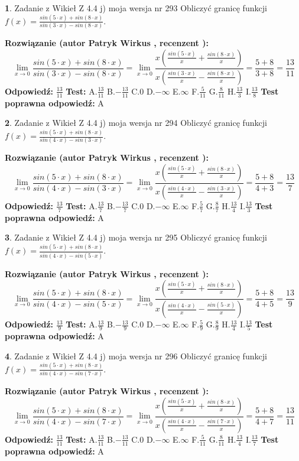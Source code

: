 \documentclass[12pt, a4paper]{article}
\theoremstyle{definition} %
\newtheorem{zad}{}
\newcommand{\zadStart}[1]{\begin{zad}#1\newline}
\newcommand{\zadStop}{\end{zad}}
\newcommand{\rozwStart}[2]{\noindent \textbf{Rozwiązanie (autor #1 , recenzent #2): }\newline}
\newcommand{\rozwStop}{\newline}
\newcommand{\odpStart}{\noindent \textbf{Odpowiedź:}\newline}
\newcommand{\odpStop}{\newline}
\newcommand{\testStart}{\noindent \textbf{Test:}\newline}
\newcommand{\testStop}{\newline}
\newcommand{\kluczStart}{\noindent \textbf{Test poprawna odpowiedź:}\newline}
\newcommand{\kluczStop}{\newline}
\begin{document}
\zadStart{Zadanie z Wikieł Z 4.4 j) moja wersja nr 293}
Obliczyć granicę funkcji $f(x)=\frac{sin(5\cdot x) +sin(8\cdot x)}{sin(3\cdot x) -sin(8\cdot x)}$.
\zadStop
\rozwStart{Patryk Wirkus}{}
$$\lim\limits_{x\to 0}\frac{sin(5\cdot x) +sin(8\cdot x)}{sin(3\cdot x) -sin(8\cdot x)}=\lim\limits_{x\to 0}\frac{x(\frac{sin(5\cdot x)}{x}+\frac{sin(8\cdot x)}{x})}{x(\frac{sin(3\cdot x)}{x}-\frac{sin(8\cdot x)}{x})}=\frac{5+8}{3+8} = \frac{13}{11}$$
\rozwStop
\odpStart
$\frac{13}{11}$
\odpStop
\testStart
A.$\frac{13}{11}$
B.$-\frac{13}{11}$
C.$0$
D.$-\infty$
E.$\infty$
F.$\frac{5}{11}$
G.$\frac{8}{11}$
H.$\frac{13}{3}$
I.$\frac{13}{8}$
\testStop
\kluczStart
A
\kluczStop



\zadStart{Zadanie z Wikieł Z 4.4 j) moja wersja nr 294}
Obliczyć granicę funkcji $f(x)=\frac{sin(5\cdot x) +sin(8\cdot x)}{sin(4\cdot x) -sin(3\cdot x)}$.
\zadStop
\rozwStart{Patryk Wirkus}{}
$$\lim\limits_{x\to 0}\frac{sin(5\cdot x) +sin(8\cdot x)}{sin(4\cdot x) -sin(3\cdot x)}=\lim\limits_{x\to 0}\frac{x(\frac{sin(5\cdot x)}{x}+\frac{sin(8\cdot x)}{x})}{x(\frac{sin(4\cdot x)}{x}-\frac{sin(3\cdot x)}{x})}=\frac{5+8}{4+3} = \frac{13}{7}$$
\rozwStop
\odpStart
$\frac{13}{7}$
\odpStop
\testStart
A.$\frac{13}{7}$
B.$-\frac{13}{7}$
C.$0$
D.$-\infty$
E.$\infty$
F.$\frac{5}{7}$
G.$\frac{8}{7}$
H.$\frac{13}{4}$
I.$\frac{13}{3}$
\testStop
\kluczStart
A
\kluczStop



\zadStart{Zadanie z Wikieł Z 4.4 j) moja wersja nr 295}
Obliczyć granicę funkcji $f(x)=\frac{sin(5\cdot x) +sin(8\cdot x)}{sin(4\cdot x) -sin(5\cdot x)}$.
\zadStop
\rozwStart{Patryk Wirkus}{}
$$\lim\limits_{x\to 0}\frac{sin(5\cdot x) +sin(8\cdot x)}{sin(4\cdot x) -sin(5\cdot x)}=\lim\limits_{x\to 0}\frac{x(\frac{sin(5\cdot x)}{x}+\frac{sin(8\cdot x)}{x})}{x(\frac{sin(4\cdot x)}{x}-\frac{sin(5\cdot x)}{x})}=\frac{5+8}{4+5} = \frac{13}{9}$$
\rozwStop
\odpStart
$\frac{13}{9}$
\odpStop
\testStart
A.$\frac{13}{9}$
B.$-\frac{13}{9}$
C.$0$
D.$-\infty$
E.$\infty$
F.$\frac{5}{9}$
G.$\frac{8}{9}$
H.$\frac{13}{4}$
I.$\frac{13}{5}$
\testStop
\kluczStart
A
\kluczStop



\zadStart{Zadanie z Wikieł Z 4.4 j) moja wersja nr 296}
Obliczyć granicę funkcji $f(x)=\frac{sin(5\cdot x) +sin(8\cdot x)}{sin(4\cdot x) -sin(7\cdot x)}$.
\zadStop
\rozwStart{Patryk Wirkus}{}
$$\lim\limits_{x\to 0}\frac{sin(5\cdot x) +sin(8\cdot x)}{sin(4\cdot x) -sin(7\cdot x)}=\lim\limits_{x\to 0}\frac{x(\frac{sin(5\cdot x)}{x}+\frac{sin(8\cdot x)}{x})}{x(\frac{sin(4\cdot x)}{x}-\frac{sin(7\cdot x)}{x})}=\frac{5+8}{4+7} = \frac{13}{11}$$
\rozwStop
\odpStart
$\frac{13}{11}$
\odpStop
\testStart
A.$\frac{13}{11}$
B.$-\frac{13}{11}$
C.$0$
D.$-\infty$
E.$\infty$
F.$\frac{5}{11}$
G.$\frac{8}{11}$
H.$\frac{13}{4}$
I.$\frac{13}{7}$
\testStop
\kluczStart
A
\kluczStop
\end{document}
